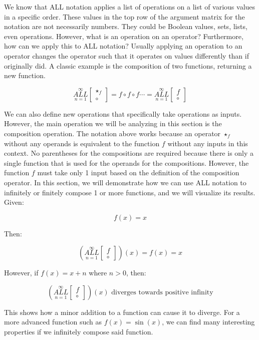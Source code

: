 \documentclass{article}
\begin{document}
We know that ALL notation applies a list of operations on a list of various values in a specific order. These values in the top row of the argument matrix for the notation are not necessarily numbers. They could be Boolean values, sets, lists, even operations. However, what is an operation on an operator? Furthermore, how can we apply this to ALL notation? Usually applying an operation to an operator changes the operator such that it operates on values differently than if originally did. A classic example is the composition of two functions, returning a new function.

$$\underset{n=1}{\overset{\infty}{ALL}} \begin{bmatrix}
\star_f \\
\circ
\end{bmatrix} = f \circ f \circ f \cdots = \underset{n=1}{\overset{\infty}{ALL}} \begin{bmatrix}
f \\
\circ
\end{bmatrix} $$

We can also define new operations that specifically take operations as inputs. However, the main operation we will be analyzing in this section is the composition operation. The notation above works because an operator $\star_f$ without any operands is equivalent to the function $f$ without any inputs in this context. No parentheses for the compositions are required because there is only a single function that is used for the operands for the compositions. However, the function $f$ must take only 1 input based on the definition of the composition operator. In this section, we will demonstrate how we can use ALL notation to infinitely or finitely compose 1 or more functions, and we will visualize its results. Given:

$$f(x)=x$$

Then:

$$(\underset{n=1}{\overset{\infty}{ALL}} \begin{bmatrix}
f \\
\circ
\end{bmatrix})(x) = f(x) = x$$

However, if $f(x)=x+n$ where $n>0$, then:

$$(\underset{n=1}{\overset{\infty}{ALL}} \begin{bmatrix}
f \\
\circ
\end{bmatrix})(x) \text{ diverges towards positive infinity}$$

This shows how a minor addition to a function can cause it to diverge. For a more advanced function such as $f(x)=\sin(x)$, we can find many interesting properties if we infinitely compose said function.
\end{document}
